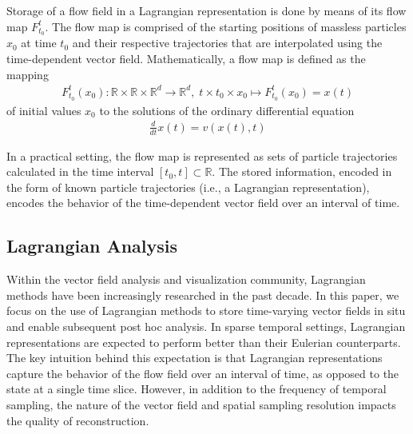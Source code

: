 \documentclass[runningheads]{llncs}
\begin{document}
Storage of a flow field in a Lagrangian representation is done by means of its flow map $F_{t_0}^{t}$.
%
The flow map is comprised of the starting positions of massless particles $x_0$ at time $t_0$ and their respective trajectories that are interpolated using the time-dependent vector field.
%
Mathematically, a flow map is defined as the mapping
\begin{eqnarray}
F_{t_0}^{t}(x_0):\mathbb R \times \mathbb R \times \mathbb R^d \to \mathbb R^d,\; t \times t_0 \times x_0 \mapsto F_{t_0}^{t}(x_0) = x(t)
\end{eqnarray}
%
of initial values $x_0$ to the solutions of the ordinary differential equation
%
\begin{eqnarray}
\frac{d}{dt}x(t) = v(x(t),t)
\end{eqnarray}

In a practical setting, the flow map is represented as sets of particle trajectories calculated in the time interval $[t_0,t]\subset \mathbb R$.
%
The stored information, encoded in the form of known particle trajectories (i.e., a Lagrangian representation), encodes the behavior of the time-dependent vector field over an interval of time.
%
\renewcommand{\baselinestretch}{1}

\vspace{-1mm}
\subsection{Lagrangian Analysis}
Within the vector field analysis and visualization community, Lagrangian methods have been increasingly researched in the past decade.
%
In this paper, we focus on the use of Lagrangian methods to store time-varying vector fields in situ and enable subsequent post hoc analysis.
%
%
In sparse temporal settings, Lagrangian representations are expected to perform better than their Eulerian counterparts.
%
The key intuition behind this expectation is that Lagrangian representations capture the behavior of the flow field over an interval of time, as opposed to the state at a single time slice.
%
However, in addition to the frequency of temporal sampling, the nature of the vector field and spatial sampling resolution impacts the quality of reconstruction.
%
\end{document}

